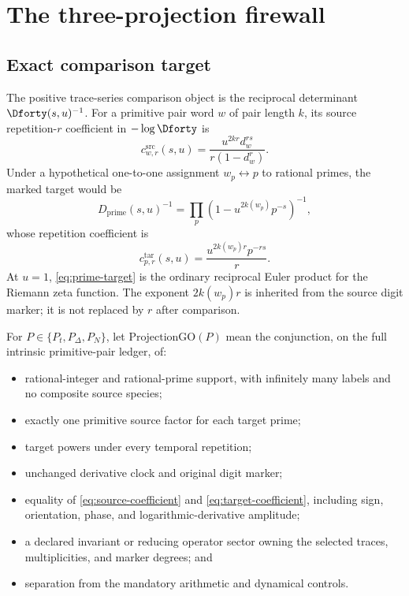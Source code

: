 \section{The three-projection firewall}
\label{sec:firewall}

\subsection{Exact comparison target}

The positive trace-series comparison object is the reciprocal determinant
$\Dforty(s,u)^{-1}$.  For a primitive pair word $w$ of pair length $k$, its
source repetition-$r$ coefficient in $-\log\Dforty$ is
\begin{equation}
  c_{w,r}^{\mathrm{src}}(s,u)
  =\frac{u^{2kr}d_w^{rs}}{r(1-d_w^r)}.
  \label{eq:source-coefficient}
\end{equation}
Under a hypothetical one-to-one assignment $w_p\leftrightarrow p$ to
rational primes, the marked target would be
\begin{equation}
  D_{\mathrm{prime}}(s,u)^{-1}
  =\prod_p\left(1-u^{2k(w_p)}p^{-s}\right)^{-1},
  \label{eq:prime-target}
\end{equation}
whose repetition coefficient is
\begin{equation}
  c_{p,r}^{\mathrm{tar}}(s,u)
  =\frac{u^{2k(w_p)r}p^{-rs}}{r}.
  \label{eq:target-coefficient}
\end{equation}
At $u=1$, \eqref{eq:prime-target} is the ordinary reciprocal Euler product
for the Riemann zeta function.  The exponent $2k(w_p)r$ is inherited from the
source digit marker; it is not replaced by $r$ after comparison.

For $P\in\{P_t,P_\Delta,P_N\}$, let $\mathrm{ProjectionGO}(P)$ mean the
conjunction, on the full intrinsic primitive-pair ledger, of:

\begin{itemize}
  \item rational-integer and rational-prime support, with infinitely many
  labels and no composite source species;
  \item exactly one primitive source factor for each target prime;
  \item target powers under every temporal repetition;
  \item unchanged derivative clock and original digit marker;
  \item equality of \eqref{eq:source-coefficient} and
  \eqref{eq:target-coefficient}, including sign, orientation, phase, and
  logarithmic-derivative amplitude;
  \item a declared invariant or reducing operator sector owning the selected
  traces, multiplicities, and marker degrees; and
  \item separation from the mandatory arithmetic and dynamical controls.
\end{itemize}

